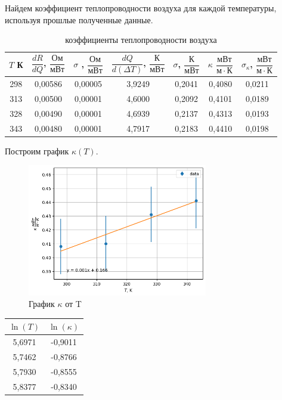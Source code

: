 \documentclass[a4paper,12pt]{article}
\begin{document}
Найдем коэффициент теплопроводности воздуха для каждой температуры, используя прошлые полученные данные. 

\begin{table}[H]
    \centering
    \begin{tabular}{|c|c|c|c|c|c|c|}
    \hline
        $T$ К & $\dfrac{dR}{dQ}$, $\dfrac{Ом}{мВт}$ & $\sigma$ , $\dfrac{Ом}{мВт}$ & $\dfrac{dQ}{d(\Delta T)}$, $\dfrac{К}{мВт}$& $\sigma$, $\dfrac{К}{мВт}$& $\kappa$ $\dfrac{мВт}{м \cdot К}$ & $ \sigma_{\kappa}$, $\dfrac{мВт}{м \cdot К}$ \\ \hline
        298 & 0,00586 & 0,00005 & 3,9249 & 0,2041 & 0,4080 & 0,0211 \\ \hline
        313 & 0,00500 & 0,00001 & 4,6000 & 0,2092 & 0,4101 & 0,0189 \\ \hline
        328 & 0,00490 & 0,00001 & 4,6939 & 0,2137 & 0,4313 & 0,0193 \\ \hline
        343 & 0,00480 & 0,00001 & 4,7917 & 0,2183 & 0,4410 & 0,0198 \\ \hline
    \end{tabular}
    \caption{коэффициенты теплопроводности воздуха}
\end{table}

Построим график $\kappa(T)$. 

\begin{figure}[H]
    \centering
    \includegraphics[width=0.7\textwidth]{kappa_new.png}
\caption{График $\kappa$ от T}
\end{figure}

\begin{table}[!ht]
    \centering
    \begin{tabular}{|c|c|}
    \hline
        $\ln (T)$ & $\ln(\kappa)$ \\ \hline
        5,6971 & -0,9011 \\ \hline
        5,7462 & -0,8766 \\ \hline
        5,7930 & -0,8555 \\ \hline
        5,8377 & -0,8340 \\ \hline
    \end{tabular}
\end{table}
\end{document}
